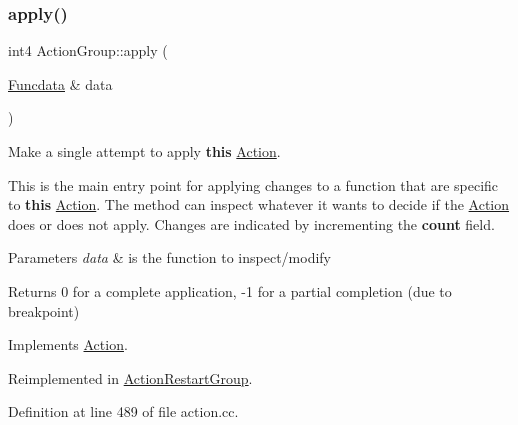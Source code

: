 \subsubsection{\texorpdfstring{apply()}{apply()}}
{\footnotesize\ttfamily int4 Action\+Group\+::apply (\begin{DoxyParamCaption}\item[{\mbox{\hyperlink{class_funcdata}{Funcdata}} \&}]{data }\end{DoxyParamCaption})\hspace{0.3cm}{\ttfamily [virtual]}}



Make a single attempt to apply {\bfseries{this}} \mbox{\hyperlink{class_action}{Action}}. 

This is the main entry point for applying changes to a function that are specific to {\bfseries{this}} \mbox{\hyperlink{class_action}{Action}}. The method can inspect whatever it wants to decide if the \mbox{\hyperlink{class_action}{Action}} does or does not apply. Changes are indicated by incrementing the {\bfseries{count}} field. 
\begin{DoxyParams}{Parameters}
{\em data} & is the function to inspect/modify \\
\hline
\end{DoxyParams}
\begin{DoxyReturn}{Returns}
0 for a complete application, -\/1 for a partial completion (due to breakpoint) 
\end{DoxyReturn}


Implements \mbox{\hyperlink{class_action_aac1c3999d6c685b15f5d9765a4d04173}{Action}}.



Reimplemented in \mbox{\hyperlink{class_action_restart_group_ab597697ab15a9b8f1a25832f43bdeb0d}{Action\+Restart\+Group}}.



Definition at line 489 of file action.\+cc.

